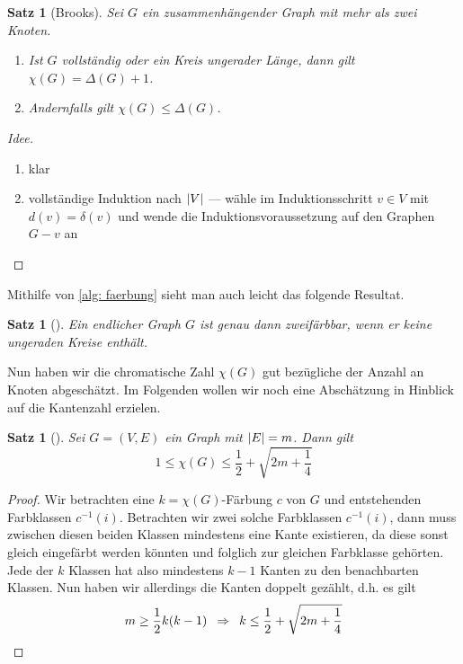 \documentclass[ngerman, a4paper, 12pt]{article}
\newcounter{themcount}
\theoremstyle{plain}
\newtheorem{satz}[themcount]{Satz}
\theoremstyle{break}
\theoremstyle{proofstyle}
\newtheorem{proof}{Beweis}
\begin{document}
	\begin{satz}[Brooks]
		Sei $G$ ein zusammenhängender Graph mit mehr als zwei Knoten.
		\begin{enumerate}[label=(\roman*), nolistsep, topsep=-\parskip]
			\item Ist $G$ vollständig oder ein Kreis ungerader Länge, dann gilt $\chi(G) = \Delta(G) + 1$.
			\item Andernfalls gilt $\chi(G) \le \Delta(G)$.
		\end{enumerate}
	\end{satz}
	\begin{proof}[Idee]
		\begin{enumerate}[label=(zu \roman*), nolistsep, leftmargin=*]
			\item klar
			\item vollständige Induktion nach $\left| V \right|$ --- wähle im Induktionsschritt $v \in V$ mit $d(v) = \delta(v)$ und wende die Induktionsvoraussetzung auf den Graphen $G - v$ an
		\end{enumerate}
	\end{proof}

	Mithilfe von \cref{alg: faerbung} sieht man auch leicht das folgende Resultat.
	
	\begin{satz}[\cite{bodirsky}]
		Ein endlicher Graph $G$ ist genau dann zweifärbbar, wenn er keine ungeraden Kreise enthält.
	\end{satz}

	Nun haben wir die chromatische Zahl $\chi(G)$ gut bezügliche der Anzahl an Knoten abgeschätzt. Im Folgenden wollen wir noch eine Abschätzung in Hinblick auf die Kantenzahl erzielen.
	
	\begin{satz}[\cite{diestel}]
		Sei $G = (V,E)$ ein Graph mit $\left| E \right| = m$. Dann gilt
		\begin{equation}
			1 \le \chi(G) \le \frac{1}{2} + \sqrt{2m + \frac{1}{4}}
			\label{eq: chi-kanten}
		\end{equation}
	\end{satz}
	\begin{proof}
		Wir betrachten eine $k = \chi(G)$-Färbung $c$ von $G$ und entstehenden Farbklassen $c^{-1}(i)$. Betrachten wir zwei solche Farbklassen $c^{-1}(i)$, dann muss zwischen diesen beiden Klassen mindestens eine Kante existieren, da diese sonst gleich eingefärbt werden könnten und folglich zur gleichen Farbklasse gehörten. Jede der $k$ Klassen hat also mindestens $k-1$ Kanten zu den benachbarten Klassen. Nun haben wir allerdings die Kanten doppelt gezählt, d.h. es gilt
		\begin{equation*}
			m \ge \frac{1}{2} k (k-1) \enskip \Rightarrow \enskip k \le \frac{1}{2} + \sqrt{2m + \frac{1}{4}}
		\end{equation*}
	\end{proof}
\end{document}
